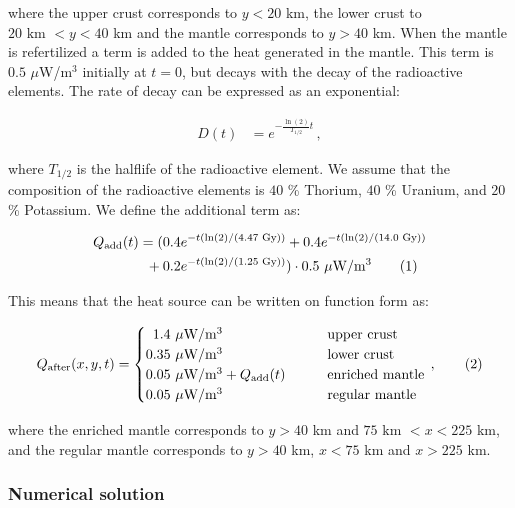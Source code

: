 \documentclass[reprint,english,notitlepage]{revtex4-1}  %
\newcommand\numberthis{\addtocounter{equation}{1}\tag{\theequation}}
\begin{document}
where the upper crust corresponds to $y<20$ km, the lower crust to $20 \text{ km } < y < 40$ km and the mantle corresponds to $y > 40$ km. When the mantle is refertilized a term is added to the heat generated in the mantle. This term is $0.5$ $\mu$W/m$^3$ initially at $t=0$, but decays with the decay of the radioactive elements. The rate of decay can be expressed as an exponential:

\begin{align*}
D(t) &= e^{-\frac{\ln(2)}{T_{1/2}} t} \, ,
\end{align*}

where $T_{1/2}$ is the halflife of the radioactive element. We assume that the composition of the radioactive elements is $40$ \% Thorium, $40$ \% Uranium, and $20$ \% Potassium. We define the additional term as:

\begin{align*}
Q_\text{add}(t) &= (0.4e^{-t(\ln(2)/(4.47  \text{ Gy}))   } + 0.4e^{-t(\ln(2)/(14.0  \text{ Gy}))   } \\
&\,\,\,+ 0.2e^{-t(\ln(2)/(1.25  \text{ Gy}))   }) \cdot 0.5 \text{ $\mu$W/m$^3$} \numberthis \label{eq:additional_heat}
\end{align*}

This means that the heat source can be written on function form as:

\begin{align*}
Q_\text{after}(x,y,t) = \begin{cases}
\,\,\, 1.4 \text{ $\mu$W/m$^3$} \quad \quad  &\text{upper crust} \\
0.35 \text{ $\mu$W/m$^3$} \quad \quad &\text{lower crust} \\
0.05 \text{ $\mu$W/m$^3$} + Q_\text{add}(t) \quad \quad &\text{enriched mantle} \\
0.05 \text{ $\mu$W/m$^3$} \quad \quad & \text{regular mantle}
\end{cases} \, , \numberthis \label{eq:refertilized_heat}
\end{align*}

where the enriched mantle corresponds to $y>40$ km and $75 \text{ km } < x < 225$ km, and the regular mantle corresponds to $y> 40$ km, $x<75$ km and $x>225$ km.
 



\subsubsection{Numerical solution} \label{sec:formalism_heat_eq_with_source_numerical_sol}
\end{document}
